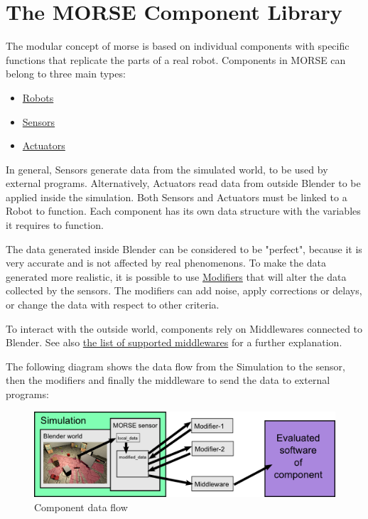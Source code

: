 \documentclass[twoside,a4paper,10pt]{report}
\newcommand{\dokutitlelevelone}[1]{\chapter{#1}}
\newcommand{\dokuitem}{\item}
\begin{document}
\dokutitlelevelone{The MORSE Component Library}
\label{1d548ae3d571b50e147fca31be425d0f}%
\label{004fdec0cc1a00c19c57e892b7eb1400}%

The modular concept of morse is based on individual components with specific functions that replicate the parts of a real robot. Components in MORSE can belong to three main types:


\begin{itemize}
\dokuitem  \hyperref[d69ac14cd721dd995822d4e984f48116]{ Robots}
\dokuitem  \hyperref[029aee483db9ae244d7a5cb353e74602]{ Sensors}
\dokuitem  \hyperref[2068e59180763f350d66a42e828e7f96]{ Actuators}
\end{itemize}

In general, Sensors generate data from the simulated world, to be used by external programs. Alternatively, Actuators read data from outside Blender to be applied inside the simulation. Both Sensors and Actuators must be linked to a Robot to function.
Each component has its own data structure with the variables it requires to function.

The data generated inside Blender can be considered to be "perfect", because it is very accurate and is not affected by real phenomenons. To make the data generated more realistic, it is possible to use \hyperref[bf24b44a8cc99e648657b164c8aba758]{ Modifiers} that will alter the data collected by the sensors. The modifiers can add noise, apply corrections or delays, or change the data with respect to other criteria.

To interact with the outside world, components rely on Middlewares connected to Blender. See also \hyperref[9a05db9c4b60b0527010fd997682f523]{ the list of supported middlewares} for a further explanation.

The following diagram shows the data flow from the Simulation to the sensor, then the modifiers and finally the middleware to send the data to external programs:
\begin{figure}[h]
\centering
\includegraphics[width=500pt]{component_diagram.png}
\caption{Component data flow}
\end{figure}
\end{document}
